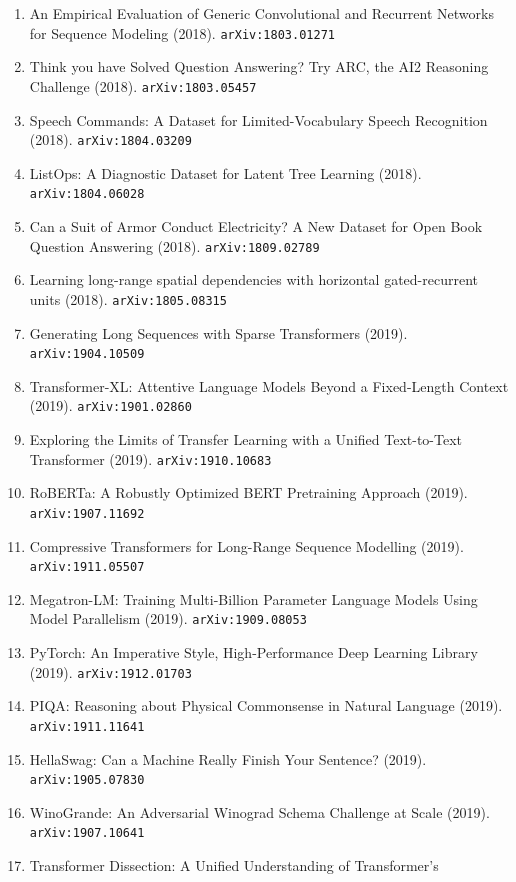 \documentclass[11pt]{article}
\begin{document}
\begin{enumerate}
  Understanding (2018). \texttt{arXiv:1804.07461}
  \item An Empirical Evaluation of Generic Convolutional and Recurrent Networks
  for Sequence Modeling (2018). \texttt{arXiv:1803.01271}
  \item Think you have Solved Question Answering? Try ARC, the AI2 Reasoning
  Challenge (2018). \texttt{arXiv:1803.05457}
  \item Speech Commands: A Dataset for Limited-Vocabulary Speech Recognition (2018). \texttt{arXiv:1804.03209}
  \item ListOps: A Diagnostic Dataset for Latent Tree Learning (2018). \texttt{arXiv:1804.06028}
  \item Can a Suit of Armor Conduct Electricity? A New Dataset for Open Book
  Question Answering (2018). \texttt{arXiv:1809.02789}
  \item Learning long-range spatial dependencies with horizontal gated-recurrent
  units (2018). \texttt{arXiv:1805.08315}
  \item Generating Long Sequences with Sparse Transformers (2019). \texttt{arXiv:1904.10509}
  \item Transformer-XL: Attentive Language Models Beyond a Fixed-Length Context (2019). \texttt{arXiv:1901.02860}
  \item Exploring the Limits of Transfer Learning with a Unified Text-to-Text
  Transformer (2019). \texttt{arXiv:1910.10683}
  \item RoBERTa: A Robustly Optimized BERT Pretraining Approach (2019). \texttt{arXiv:1907.11692}
  \item Compressive Transformers for Long-Range Sequence Modelling (2019). \texttt{arXiv:1911.05507}
  \item Megatron-LM: Training Multi-Billion Parameter Language Models Using
  Model Parallelism (2019). \texttt{arXiv:1909.08053}
  \item PyTorch: An Imperative Style, High-Performance Deep Learning Library (2019). \texttt{arXiv:1912.01703}
  \item PIQA: Reasoning about Physical Commonsense in Natural Language (2019). \texttt{arXiv:1911.11641}
  \item HellaSwag: Can a Machine Really Finish Your Sentence? (2019). \texttt{arXiv:1905.07830}
  \item WinoGrande: An Adversarial Winograd Schema Challenge at Scale (2019). \texttt{arXiv:1907.10641}
  \item Transformer Dissection: A Unified Understanding of Transformer's

\end{enumerate}
\end{document}
